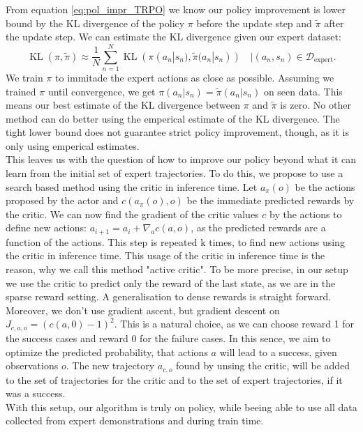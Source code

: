 From equation \ref{eq:pol_impr_TRPO} we know our policy improvement is lower bound by the KL divergence of the policy $\pi$ before the update step and 
$\tilde{\pi}$ after the update step. We can estimate the KL divergence given our expert dataset:
\begin{equation*}  
    {\operatorname{KL}} (\pi,\tilde{\pi}) \approx \frac{1}{N} \sum_{n=1}^N {\operatorname{KL}} (\pi(a_n|s_n),\tilde{\pi}(a_n|s_n)) \quad |(a_n,s_n) \in \mathcal{D}_{\text{expert}}.
\end{equation*}  
We train $\pi$ to immitade the expert actions as close as possible. Assuming we trained $\pi$ until convergence, we get $\pi(a_n|s_n) = \tilde{\pi}(a_n|s_n)$ on seen 
data. This means our best estimate of the KL divergence between $\pi$ and $\tilde{\pi}$ is zero. No other method can do better using the emperical 
estimate of the KL divergence. The tight lower bound does not guarantee strict policy improvement, though, as it is only using emperical estimates.
\\
This leaves us with the question of how to improve our policy beyond what it can learn from the initial set of expert trajectories. To do this, we propose to use 
a search based method using the critic in inference time. Let $a_{\pi}(o)$ be the actions proposed by the actor and $c(a_{\pi}(o), o)$ be the immediate predicted rewards by the critic. 
We can now find the gradient of the critic values $c$ by the actions to define new actions: $a_{i+1} = a_i + \nabla_{a}c(a, o)$, as the predicted rewards are a 
function of the actions. This step is repeated k times, to find new actions using the critic in inference time. This usage of the critic in inference time 
is the reason, why we call this method "active critic". To be more precise, in our setup we use the critic to predict only the reward of the last state, as we are 
in the sparse reward setting. A generalisation to dense rewards is straight forward. Moreover, we don't use gradient ascent, but gradient descent on 
$J_{c, a, o} = (c(a, 0) - 1)^2$. This is a natural choice, as we can 
choose reward 1 for the success cases and reward 0 for the failure cases. In this sence, we aim to optimize the predicted probability, that actions $a$ will lead 
to a success, given observations $o$. The new trajectory $a_{c, o}$ found by unsing the critic, will 
be added to the set of trajectories for the critic and to the set of expert trajectories, if it was a success. \\
With this setup, our algorithm is truly on policy, while beeing able to use all data collected from expert demonstrations and during train time. 

